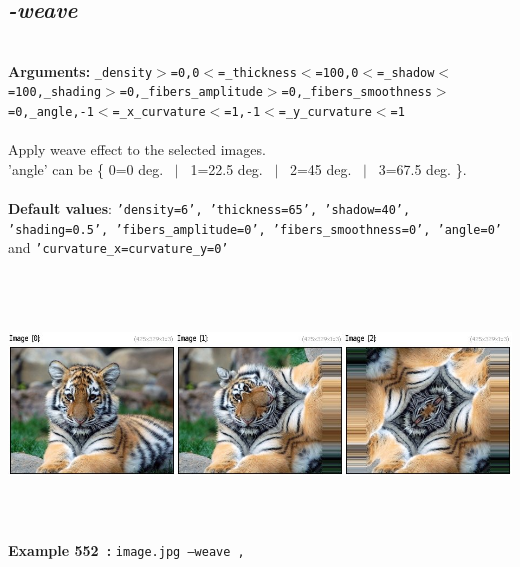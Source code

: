 \documentclass[a4paper,11pt,twoside]{book}
\begin{document}
\subsection{\emph{-weave} }\vspace*{-0.5em}
~\\\textbf{Arguments: } 
{\small \texttt{\_density$>$=0,0$<$=\_thickness$<$=100,0$<$=\_shadow$<$=100,\_shading$>$=0,\_fibers\_amplitude$>$=0,\_fibers\_smoothness$>$=0,\_angle,-1$<$=\_x\_curvature$<$=1,-1$<$=\_y\_curvature$<$=1}}\\~\\
Apply weave effect to the selected images.
~\\'angle' can be \{ 0=0 deg. ~$|$~ 1=22.5 deg. ~$|$~ 2=45 deg. ~$|$~ 3=67.5 deg. \}.
~\\~\\\textbf{Default values}: {\small \texttt{'density=6', 'thickness=65', 'shadow=40', 'shading=0.5', 'fibers\_amplitude=0', 'fibers\_smoothness=0', 'angle=0'} and \texttt{'curvature\_x=curvature\_y=0'}}
\begin{center}\includegraphics[keepaspectratio=true,height=7cm,width=\textwidth]{img/gmic_def552.jpg}\\
{\footnotesize \textbf{Example 552~:} \texttt{image.jpg --weave ,}}
\end{center}
\end{document}
